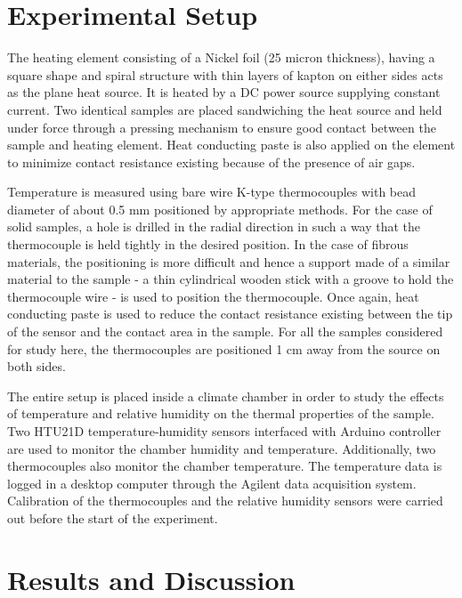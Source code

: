 \documentclass[12pt]{report}
\begin{document}
\section*{Experimental Setup}

The heating element consisting of a Nickel foil (25 micron thickness),
having a square shape and spiral structure with thin layers of kapton on
either sides acts as the plane heat source. It is heated by a DC power
source supplying constant current. Two identical samples are placed
sandwiching the heat source and held under force through a pressing
mechanism to ensure good contact between the sample and heating element.
Heat conducting paste is also applied on the element to minimize
contact resistance existing because of the presence of air gaps.

Temperature is measured using bare wire K-type thermocouples with bead diameter of about 0.5 mm positioned
by appropriate methods. For the case of solid samples, a hole is drilled
in the radial direction in such a way that the thermocouple is held
tightly in the desired position. In the case of fibrous materials, the
positioning is more difficult and hence a support made of a similar
material to the sample - a thin cylindrical wooden stick with a groove to hold the thermocouple wire - is used to position the thermocouple. Once again, heat conducting paste is used to reduce the
contact resistance existing between the tip of the sensor and the
contact area in the sample. For all the samples considered for study here, the thermocouples
are positioned 1 cm away from the source on both sides.

The entire setup is placed inside a climate
chamber in order to study the effects of temperature and relative
humidity on the thermal properties of the sample. Two HTU21D temperature-humidity sensors
interfaced with Arduino controller are used to monitor the chamber
humidity and temperature. Additionally, two thermocouples also
monitor the chamber temperature. The temperature data is logged in a
desktop computer through the Agilent data acquisition system.
Calibration of the thermocouples and the relative humidity sensors were
carried out before the start of the experiment.




\section*{Results and Discussion}
\end{document}

